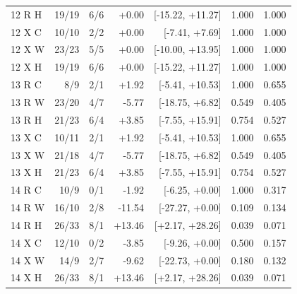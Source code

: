 {\begin{longtable}{lrrrrrr}
12 R H & 19/19 & 6/6 & +0.00 & [-15.22, +11.27] & 1.000 & 1.000\\
12 X C & 10/10 & 2/2 & +0.00 & [-7.41, +7.69] & 1.000 & 1.000\\
12 X W & 23/23 & 5/5 & +0.00 & [-10.00, +13.95] & 1.000 & 1.000\\
12 X H & 19/19 & 6/6 & +0.00 & [-15.22, +11.27] & 1.000 & 1.000\\
13 R C & 8/9 & 2/1 & +1.92 & [-5.41, +10.53] & 1.000 & 0.655\\
13 R W & 23/20 & 4/7 & -5.77 & [-18.75, +6.82] & 0.549 & 0.405\\
13 R H & 21/23 & 6/4 & +3.85 & [-7.55, +15.91] & 0.754 & 0.527\\
13 X C & 10/11 & 2/1 & +1.92 & [-5.41, +10.53] & 1.000 & 0.655\\
13 X W & 21/18 & 4/7 & -5.77 & [-18.75, +6.82] & 0.549 & 0.405\\
13 X H & 21/23 & 6/4 & +3.85 & [-7.55, +15.91] & 0.754 & 0.527\\
14 R C & 10/9 & 0/1 & -1.92 & [-6.25, +0.00] & 1.000 & 0.317\\
14 R W & 16/10 & 2/8 & -11.54 & [-27.27, +0.00] & 0.109 & 0.134\\
14 R H & 26/33 & 8/1 & +13.46 & [+2.17, +28.26] & 0.039 & 0.071\\
14 X C & 12/10 & 0/2 & -3.85 & [-9.26, +0.00] & 0.500 & 0.157\\
14 X W & 14/9 & 2/7 & -9.62 & [-22.73, +0.00] & 0.180 & 0.132\\
14 X H & 26/33 & 8/1 & +13.46 & [+2.17, +28.26] & 0.039 & 0.071\\
\bottomrule\end{longtable}}